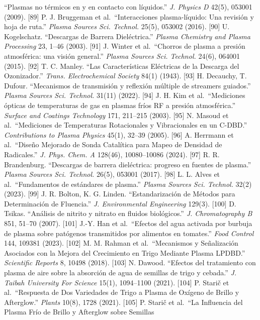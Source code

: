 \documentclass[
  10pt,
  letterpaper,
  twocolumn]{article}
\begin{document}
``Plasmas no térmicos en y en contacto con líquidos.'' \emph{J. Physics
D} 42(5), 053001 (2009). {[}89{]} P. J. Bruggeman et al.~``Interacciones
plasma-líquido: Una revisión y hoja de ruta.'' \emph{Plasma Sources Sci.
Technol.} 25(5), 053002 (2016). {[}90{]} U. Kogelschatz. ``Descargas de
Barrera Dieléctrica.'' \emph{Plasma Chemistry and Plasma Processing} 23,
1--46 (2003). {[}91{]} J. Winter et al.~``Chorros de plasma a presión
atmosférica: una visión general.'' \emph{Plasma Sources Sci. Technol.}
24(6), 064001 (2015). {[}92{]} T. C. Manley. ``Las Características
Eléctricas de la Descarga del Ozonizador.'' \emph{Trans. Electrochemical
Society} 84(1) (1943). {[}93{]} H. Decauchy, T. Dufour. ``Mecanismos de
transmisión y reflexión múltiple de streamers guiados.'' \emph{Plasma
Sources Sci. Technol.} 31(11) (2022). {[}94{]} J. H. Kim et
al.~``Mediciones ópticas de temperaturas de gas en plasmas fríos RF a
presión atmosférica.'' \emph{Surface and Coatings Technology} 171,
211--215 (2003). {[}95{]} N. Masoud et al.~``Mediciones de Temperaturas
Rotacionales y Vibracionales en un C-DBD.'' \emph{Contributions to
Plasma Physics} 45(1), 32--39 (2005). {[}96{]} A. Herrmann et
al.~``Diseño Mejorado de Sonda Catalítica para Mapeo de Densidad de
Radicales.'' \emph{J. Phys. Chem. A} 128(46), 10080--10086 (2024).
{[}97{]} R. R. Brandenburg. ``Descargas de barrera dieléctrica: progreso
en fuentes de plasma.'' \emph{Plasma Sources Sci. Technol.} 26(5),
053001 (2017). {[}98{]} L. L. Alves et al.~``Fundamentos de estándares
de plasma.'' \emph{Plasma Sources Sci. Technol.} 32(2) (2023). {[}99{]}
J. R. Bolton, K. G. Linden. ``Estandarización de Métodos para
Determinación de Fluencia.'' \emph{J. Environmental Engineering} 129(3).
{[}100{]} D. Tsikas. ``Análisis de nitrito y nitrato en fluidos
biológicos.'' \emph{J. Chromatography B} 851, 51--70 (2007). {[}101{]}
J.-Y. Han et al.~``Efectos del agua activada por burbuja de plasma sobre
patógenos transmitidos por alimentos en tomates.'' \emph{Food Control}
144, 109381 (2023). {[}102{]} M. M. Rahman et al.~``Mecanismos y
Señalización Asociados con la Mejora del Crecimiento en Trigo Mediante
Plasma LPDBD.'' \emph{Scientific Reports} 8, 10498 (2018). {[}103{]} N.
Dawood. ``Efectos del tratamiento con plasma de aire sobre la absorción
de agua de semillas de trigo y cebada.'' \emph{J. Taibah University For
Science} 15(1), 1094--1100 (2021). {[}104{]} P. Starič et
al.~``Respuesta de Dos Variedades de Trigo a Plasma de Oxígeno de Brillo
y Afterglow.'' \emph{Plants} 10(8), 1728 (2021). {[}105{]} P. Starič et
al.~``La Influencia del Plasma Frío de Brillo y Afterglow sobre Semillas
\end{document}
